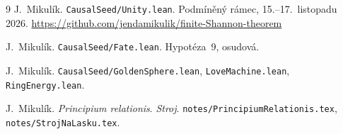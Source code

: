 \documentclass[11pt,a4paper]{article}
\theoremstyle{definition}
\theoremstyle{remark}
\begin{document}
\begin{thebibliography}{9}
J.~Mikulík.
\newblock \texttt{CausalSeed/Unity.lean}.
\newblock Podmíněný rámec, 15.--17.~listopadu 2026.
\newblock \url{https://github.com/jendamikulik/finite-Shannon-theorem}

J.~Mikulík.
\newblock \texttt{CausalSeed/Fate.lean}.
\newblock Hypotéza~9, osudová.

J.~Mikulík.
\newblock \texttt{CausalSeed/GoldenSphere.lean}, \texttt{LoveMachine.lean},
          \texttt{RingEnergy.lean}.

J.~Mikulík.
\newblock \emph{Principium relationis}. \emph{Stroj}.
\newblock \texttt{notes/PrincipiumRelationis.tex}, \texttt{notes/StrojNaLasku.tex}.
\end{thebibliography}
\end{document}
